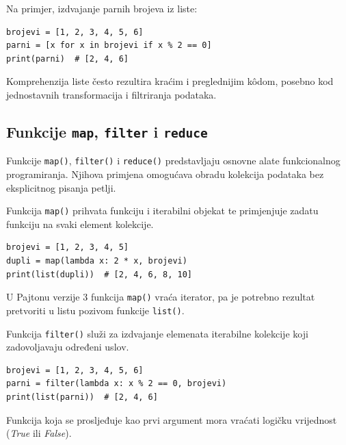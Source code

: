 Na primjer, izdvajanje parnih brojeva iz liste:

\begin{verbatim}
brojevi = [1, 2, 3, 4, 5, 6]
parni = [x for x in brojevi if x % 2 == 0]
print(parni)  # [2, 4, 6]
\end{verbatim}

Komprehenzija liste često rezultira kraćim i preglednijim k\^odom, posebno kod jednostavnih transformacija i filtriranja podataka.

\subsection{Funkcije \texttt{map}, \texttt{filter} i \texttt{reduce}}

Funkcije \texttt{map()}, \texttt{filter()} i \texttt{reduce()} predstavljaju osnovne alate funkcionalnog programiranja. Njihova primjena omogućava obradu kolekcija podataka bez eksplicitnog pisanja petlji.


Funkcija \texttt{map()} prihvata funkciju i iterabilni objekat te primjenjuje zadatu funkciju na svaki element kolekcije.

\begin{verbatim}
brojevi = [1, 2, 3, 4, 5]
dupli = map(lambda x: 2 * x, brojevi)
print(list(dupli))  # [2, 4, 6, 8, 10]
\end{verbatim}

U Pajtonu verzije 3 funkcija \texttt{map()} vraća iterator, pa je potrebno rezultat pretvoriti u listu pozivom funkcije \texttt{list()}.


Funkcija \texttt{filter()} služi za izdvajanje elemenata iterabilne kolekcije koji zadovoljavaju određeni uslov.

\begin{verbatim}
brojevi = [1, 2, 3, 4, 5, 6]    
parni = filter(lambda x: x % 2 == 0, brojevi)
print(list(parni))  # [2, 4, 6]
\end{verbatim}

Funkcija koja se prosljeđuje kao prvi argument mora vraćati logičku vrijednost (\textit{True} ili \textit{False}).

